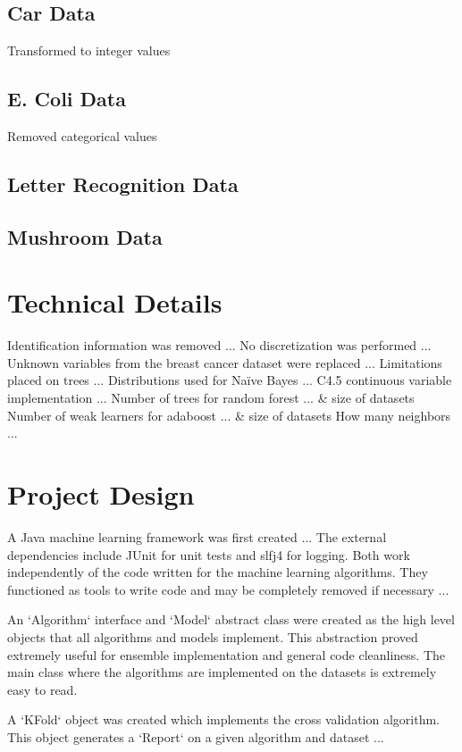 \documentclass[11pt]{article}
\begin{document}
\subsection{Car Data}
Transformed to integer values

\subsection{E. Coli Data}
Removed categorical values

\subsection{Letter Recognition Data}
\subsection{Mushroom Data}

\section{Technical Details}
Identification information was removed ...
No discretization was performed ...
Unknown variables from the breast cancer dataset were replaced ...
Limitations placed on trees ...
Distributions used for Naïve Bayes ...
C4.5 continuous variable implementation ...
Number of trees for random forest ... & size of datasets
Number of weak learners for adaboost ... & size of datasets
How many neighbors ...

\section{Project Design}
A Java machine learning framework was first created ...
The external dependencies include JUnit for unit tests and slfj4 for logging. Both work independently of the code written for the machine learning algorithms. They functioned as tools to write code and may be completely removed if necessary ...

An `Algorithm` interface and `Model` abstract class were created as the high level objects that all algorithms and models implement. This abstraction proved extremely useful for ensemble implementation and general code cleanliness. The main class where the algorithms are implemented on the datasets is extremely easy to read.

A `KFold` object was created which implements the cross validation algorithm. This object generates a `Report` on a given algorithm and dataset ...
\end{document}
